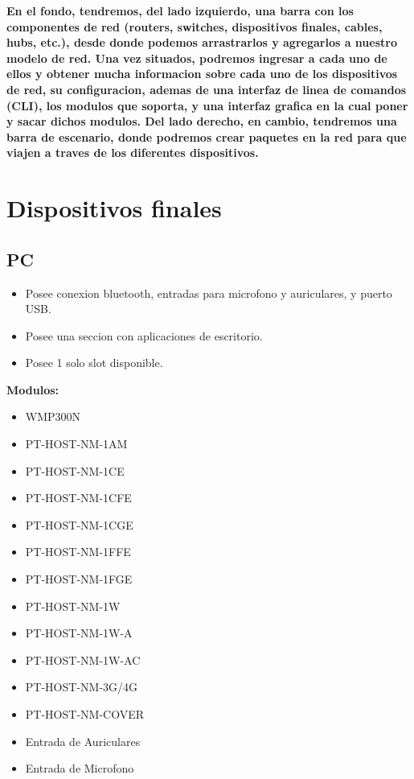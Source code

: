 \documentclass{article}
\begin{document}
\textbf{En el fondo, tendremos, del lado izquierdo, una barra con los componentes de red (routers, switches, dispositivos finales, cables, hubs, etc.), desde donde podemos arrastrarlos y agregarlos a nuestro modelo de red. Una vez situados, podremos ingresar a cada uno de ellos y obtener mucha informacion sobre cada uno de los dispositivos de red, su configuracion, ademas de una interfaz de linea de comandos (CLI), los modulos que soporta, y una interfaz grafica en la cual poner y sacar dichos modulos.
Del lado derecho, en cambio, tendremos una barra de escenario, donde podremos crear paquetes en la red para que viajen a traves de los diferentes dispositivos.} \\

\section{Dispositivos finales}
\subsection{PC}
\begin{itemize}
    \item Posee conexion bluetooth, entradas para microfono y auriculares, y puerto USB.
    \item Posee una seccion con aplicaciones de escritorio.
    \item Posee 1 solo slot disponible.
\end{itemize}

\textbf{Modulos:}
\begin{itemize}
    \item WMP300N
    \item PT-HOST-NM-1AM
    \item PT-HOST-NM-1CE
    \item PT-HOST-NM-1CFE
    \item PT-HOST-NM-1CGE
    \item PT-HOST-NM-1FFE
    \item PT-HOST-NM-1FGE
    \item PT-HOST-NM-1W
    \item PT-HOST-NM-1W-A
    \item PT-HOST-NM-1W-AC
    \item PT-HOST-NM-3G/4G
    \item PT-HOST-NM-COVER
    \item Entrada de Auriculares
    \item Entrada de Microfono
\end{itemize}
\end{document}
